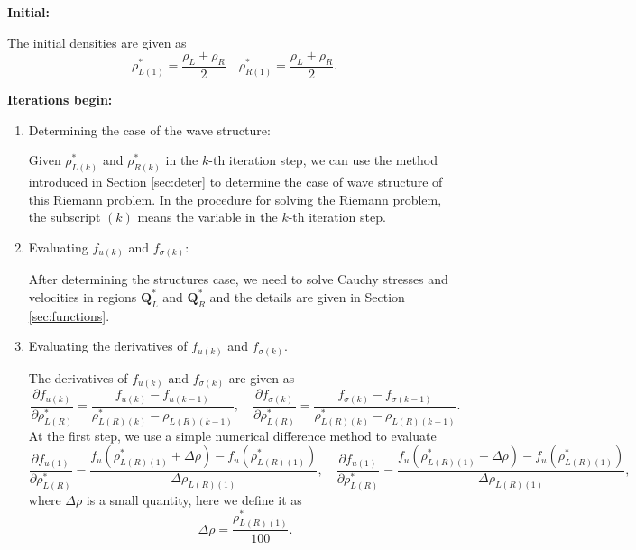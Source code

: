 \documentclass[review]{elsarticle}
\numberwithin{equation}{section}
\numberwithin{table}{section}
\begin{document}
\noindent  \textbf{Initial:}

	The initial densities are given as
\begin{equation}
  \rho_{L(1)}^* = \frac{\rho_L+\rho_R}{2} \quad \rho_{R(1)}^* = \frac{\rho_L+\rho_R}{2}.
\end{equation}

\noindent
\textbf{Iterations begin:}
\begin{enumerate}[Step 1]
  \item Determining the case of the wave structure:

	Given $\rho _{L(k)}^*$ and  $\rho _{R(k)}^*$ in the $k$-th  iteration step, we can use the method introduced in Section \ref{sec:deter} to determine the case of wave structure of this Riemann problem. In the  procedure for solving the  Riemann problem, the subscript $(k)$ means the variable in the $k$-th  iteration step.

  \item Evaluating $f_{u(k)}$ and $f_{\sigma(k)}$:

  After determining the structures case, we need  to solve  Cauchy stresses and velocities in regions $\mathbf{Q}^*_L$ and $\mathbf{Q}^*_R$ and the details are given in Section \ref{sec:functions}.

  \item Evaluating the derivatives of $f_{u(k)}$ and $f_{\sigma(k)}$.

The derivatives of $f_{u(k)}$ and $f_{\sigma(k)}$ are given as
\begin{equation}
  \frac{\partial f_{u(k)}}{\partial \rho^*_{L(R)}} = \frac{f_{u(k)}-f_{u(k-1)}}{\rho_{L(R)(k)}^* - \rho_{L(R)(k-1)}},\quad
  \frac{\partial f_{\sigma(k)}}{\partial \rho^*_{L(R)}} = \frac{f_{\sigma(k)}-f_{\sigma(k-1)}}{\rho_{L(R)(k)}^* - \rho_{L(R)(k-1)}}.
\end{equation}
At the first step, we use a simple  numerical difference  method to evaluate
\begin{equation}
  \frac{\partial f_{u(1)}}{\partial \rho^*_{L(R)}} = \frac{f_{u}(\rho^*_{L(R)(1)}+\Delta \rho)-f_{u}(\rho^*_{L(R)(1)})}{\Delta \rho_{L(R)(1)}},\quad
  \frac{\partial f_{u(1)}}{\partial \rho^*_{L(R)}} = \frac{f_{u}(\rho^*_{L(R)(1)}+\Delta \rho)-f_{u}(\rho^*_{L(R)(1)})}{\Delta \rho_{L(R)(1)}},
\end{equation}
where $\Delta \rho$ is a small quantity, here we define it as
\begin{equation}
  \Delta \rho = \frac{\rho_{L(R)(1)}^*}{100}.
\end{equation}


\end{enumerate}
\end{document}
